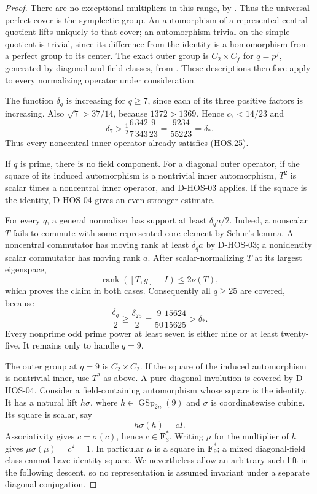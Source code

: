 \begin{proof}
There are no exceptional multipliers in this range, by
\cite[Chapter~5, complete Table~1 and preceding paragraph,
p.~35]{BI:HHM}. Thus the universal perfect cover is the symplectic
group. An automorphism of a represented central quotient lifts
uniquely to that cover; an automorphism trivial on the simple
quotient is trivial, since its difference from the identity is a
homomorphism from a perfect group to its center. The exact
outer group is $C_2\times C_f$ for $q=p^f$, generated by diagonal
and field classes, from \cite[\S2.2.2, Table~2.1,
author p.~14]{HES:LiXia2022}. These descriptions therefore
apply to every normalizing operator under consideration.

The function $\delta_q$ is increasing for $q\ge7$, since each
of its three positive factors is increasing. Also
$\sqrt7>37/14$, because $1372>1369$. Hence
$c_7<14/23$ and
\[
 \delta_7>\tfrac12\frac67\frac{342}{343}\frac9{23}
                  =\frac{9234}{55223}=\delta_* .            \tag{HOS.26}
\]
Thus every noncentral inner operator already satisfies (HOS.25).

If $q$ is prime, there is no field component. For a diagonal
outer operator, if the square of its induced automorphism is a
nontrivial inner automorphism, $T^2$ is scalar times a noncentral
inner operator, and D-HOS-03 applies. If the square is the
identity, D-HOS-04 gives an even stronger estimate.

For every $q$, a general normalizer has support at least
$\delta_q a/2$. Indeed, a nonscalar $T$ fails to commute with
some represented core element by Schur's lemma. A noncentral
commutator has moving rank at least $\delta_q a$ by D-HOS-03;
a nonidentity scalar commutator has moving rank $a$.
After scalar-normalizing $T$ at its largest eigenspace,
\[
             \operatorname{rank}([T,g]-I)\le2\nu(T),
\]
which proves the claim in both cases. Consequently all $q\ge25$
are covered, because
\[
 \frac{\delta_q}{2}\ge\frac{\delta_{25}}2
 =\frac9{50}\frac{15624}{15625}>\delta_* .                  \tag{HOS.27}
\]
Every nonprime odd prime power at least seven is either nine
or at least twenty-five. It remains only to handle $q=9$.

The outer group at $q=9$ is $C_2\times C_2$. If the square of
the induced automorphism is nontrivial inner, use $T^2$ as
above. A pure diagonal involution is covered by D-HOS-04.
Consider a field-containing automorphism whose square is the
identity. It has a natural lift $h\sigma$, where
$h\in\operatorname{GSp}_{2n}(9)$ and $\sigma$ is coordinatewise
cubing. Its square is scalar, say
\[
                         h\sigma(h)=cI.
\]
Associativity gives $c=\sigma(c)$, hence $c\in\mathbf F_3^*$.
Writing $\mu$ for the multiplier of $h$ gives
$\mu\sigma(\mu)=c^2=1$. In particular $\mu$ is a square
in $\mathbf F_9^*$; a mixed diagonal-field class cannot have
identity square. We nevertheless allow an arbitrary such lift
in the following descent, so no representation is assumed
invariant under a separate diagonal conjugation.


\end{proof}
